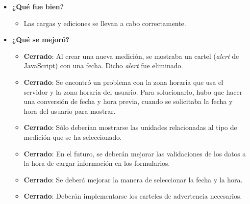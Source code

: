 	\begin{itemize}
		\item \textbf{¿Qué fue bien?}
        	\begin{itemize}
				\item Las cargas y ediciones se llevan a cabo correctamente.
			\end{itemize}

   		\item \textbf{¿Qué se mejoró?}
        	\begin{itemize}
				\item \textbf{Cerrado}: Al crear una nueva medición, se mostraba un cartel (\textit{alert} de JavaScript) con una fecha. Dicho \textit{alert} fue eliminado.
                \item \textbf{Cerrado}: Se encontró un problema con la zona horaria que usa el servidor y la zona horaria del usuario. Para solucionarlo, hubo que hacer una conversión de fecha y hora previa, cuando se solicitaba la fecha y hora del usuario para mostrar.
			\end{itemize}

        	\begin{itemize}
		        \item \textbf{Cerrado}: Sólo deberían mostrarse las unidades relacionadas al tipo de medición que se ha seleccionado.
		        \item \textbf{Cerrado}: En el futuro, se deberán mejorar las validaciones de los datos a la hora de cargar información en los formularios.
		        \item \textbf{Cerrado}: Se deberá mejorar la manera de seleccionar la fecha y la hora. 
		        \item \textbf{Cerrado}: Deberán implementarse los carteles de advertencia necesarios.
            \end{itemize}
	\end{itemize}